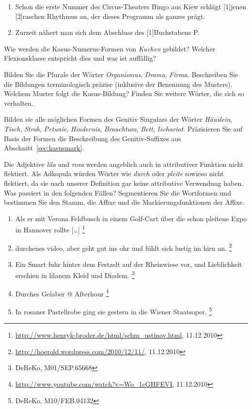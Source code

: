 \begin{sloppypar}
\begin{enumerate}
  \item Schon die erste Nummer des Circus-Theaters Bingo aus Kiew schlägt [1]jenen [2]raschen Rhythmus an, der dieses Programm als ganzes prägt.
  \item Zurzeit nähert man sich dem Abschluss des [1]Buchstabens P.
\end{enumerate}

\Uebung \label{u82} Wie werden die Kasus-Numerus-Formen von \textit{Kuchen} gebildet?
Welcher Flexionsklasse entspricht dies und was ist auffällig?

\Uebung \label{u83} Bilden Sie die Plurale der Wörter \textit{Organismus}, \textit{Drama}, \textit{Firma}.
Beschreiben Sie die Bildungen terminologisch präzise (inklusive der Benennung des Musters).
Welchem Muster folgt die Kasus-Bildung?
Finden Sie weitere Wörter, die sich so verhalten.

\Uebung \label{u83a} Bilden sie alle möglichen Formen des Genitiv Singulars der Wörter \textit{Häuslein}, \textit{Tisch}, \textit{Stroh}, \textit{Petunie}, \textit{Hindernis}, \textit{Brauchtum}, \textit{Bett}, \textit{Ischariot}.
Präzisieren Sie auf Basis der Formen die Beschreibung des Genitiv-Suffixes aus Abschnitt~\ref{sec:kasusmark}.

\Uebung \label{u84} Die Adjektive \textit{lila} und \textit{rosa} werden angeblich auch in attributiver Funktion nicht flektiert.
Als Adkopula würden Wörter wie \textit{durch} oder \textit{pleite} sowieso nicht flektiert, da sie nach unserer Definition gar keine attributive Verwendung haben.
Was passiert in den folgenden Fällen?
Segmentieren Sie die Wortformen und bestimmen Sie den Stamm, die Affixe und die Markierungsfunktionen der Affixe.

\begin{enumerate}\Lf
  \item Als er mit Verona Feldbusch in einem Golf-Cart über die schon pleitene Expo in Hannover rollte [\ldots]%
  \footnote{\raggedright{\url{http://www.henryk-broder.de/html/schm_ustinov.html}, 11.12.2010}}
  \item durchenes video, aber geht gut ins ohr und fühlt sich lustig im hirn an.%
  \footnote{\raggedright{\url{http://hoerold.wordpress.com/2010/12/11/}, 11.12.2010}}
  \item Ein Smart fuhr hinter dem Festzelt auf der Rheinwiese vor, und Lieblichkeit erschien in lilanem Kleid und Diadem.%
  \footnote{\raggedright{DeReKo, M01\slash SEP.65668}}
  \item Durches Gelaber @ Afterhour%
  \footnote{\raggedright{\url{http://www.youtube.com/watch?v=Wo_1cGHFEVI}, 11.12.2010}}
  \item In rosaner Pastellrobe ging sie gestern in die Wiener Staatsoper.%
  \footnote{\raggedright{DeReKo, M10\slash FEB.04132}}
\end{enumerate}


\end{sloppypar}
